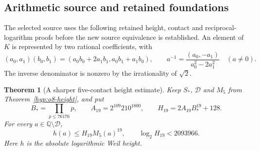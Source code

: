 \documentclass[11pt]{article}
\newtheorem{theorem}{Theorem}[section]
\theoremstyle{definition}
\theoremstyle{remark}
\begin{document}
\subsection{Arithmetic source and retained foundations}
\label{subsec:quartic-source}
The selected source uses the following retained height, contact and
reciprocal-logarithm proofs before the new source equivalence is established.
An element of $K$ is represented by two rational coefficients, with
\[
 (a_0,a_1)(b_0,b_1)=(a_0b_0+2a_1b_1,a_0b_1+a_1b_0),\qquad
 a^{-1}=\frac{(a_0,-a_1)}{a_0^2-2a_1^2}\quad(a\ne0).
\]
The inverse denominator is nonzero by the irrationality of $\sqrt2$.

\begin{theorem}[A sharper five-contact height estimate]\label{thm:quartic-height19}
Keep $S_*$, $\mathcal D$ and $M_5$ from Theorem~\ref{hyp:o8-height}, and put
\[
 B_*=\prod_{p\le76176}p,\qquad
 A_{19}=2^{109}210^{1800},\qquad H_{19}=2A_{19}B_*^{19}+128.
\]
For every $a\in\mathbb Q\setminus\mathcal D$,
\[
 h(a)\le H_{19}M_5(a)^{19},
 \qquad \log_2H_{19}<2093966.
\]
Here $h$ is the absolute logarithmic Weil height.
\end{theorem}
\end{document}

